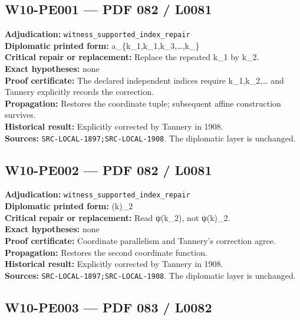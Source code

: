 \documentclass[
  10pt,
  a4paper,
]{scrreprt}
\begin{document}
\subsection{W10-PE001 --- PDF 082 /
L0081}\label{w10-pe001-pdf-082-l0081}

\textbf{Adjudication:} \texttt{witness\_supported\_index\_repair}\\
\textbf{Diplomatic printed form:} a\_\{k\_1,k\_1,k\_3,\ldots,k\_\mu\}\\
\textbf{Critical repair or replacement:} Replace the repeated k\_1 by
k\_2.\\
\textbf{Exact hypotheses:} none\\
\textbf{Proof certificate:} The declared independent indices require
k\_1,k\_2,\ldots{} and Tannery explicitly records the correction.\\
\textbf{Propagation:} Restores the coordinate tuple; subsequent affine
construction survives.\\
\textbf{Historical result:} Explicitly corrected by Tannery in 1908.\\
\textbf{Sources:} \texttt{SRC-LOCAL-1897;SRC-LOCAL-1908}. The diplomatic
layer is unchanged.

\subsection{W10-PE002 --- PDF 082 /
L0081}\label{w10-pe002-pdf-082-l0081}

\textbf{Adjudication:} \texttt{witness\_supported\_index\_repair}\\
\textbf{Diplomatic printed form:} \psi(k)\_2\\
\textbf{Critical repair or replacement:} Read ψ(k\_2), not ψ(k)\_2.\\
\textbf{Exact hypotheses:} none\\
\textbf{Proof certificate:} Coordinate parallelism and Tannery's
correction agree.\\
\textbf{Propagation:} Restores the second coordinate function.\\
\textbf{Historical result:} Explicitly corrected by Tannery in 1908.\\
\textbf{Sources:} \texttt{SRC-LOCAL-1897;SRC-LOCAL-1908}. The diplomatic
layer is unchanged.

\subsection{W10-PE003 --- PDF 083 /
L0082}\label{w10-pe003-pdf-083-l0082}
\end{document}
